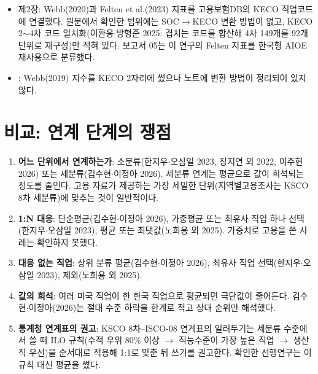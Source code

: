 \documentclass[11pt]{article}
\begin{document}
\begin{itemize}
  \item \textcite{noh-2025-ai-labor-coexistence} 제2장: Webb(2020)과 Felten et al.(2023) 지표를 고용보험DB의 KECO 직업코드에 연결했다. 원문에서 확인한 범위에는 SOC$\to$KECO 변환 방법이 없고, KECO 2$\sim$4차 코드 일치화(이환웅$\cdot$방형준 2025: 겹치는 코드를 합산해 4차 149개를 92개 단위로 재구성)만 적혀 있다. 보고서 05는 이 연구의 Felten 지표를 한국형 AIOE 재사용으로 분류했다.
  \item \textcite{kiet-2024-ai-labor-market-industry}: Webb(2019) 지수를 KECO 2자리에 썼으나 노트에 변환 방법이 정리되어 있지 않다.
\end{itemize}

\section{비교: 연계 단계의 쟁점}

\begin{enumerate}[label=\arabic*.]
  \item \textbf{어느 단위에서 연계하는가}: 소분류(한지우$\cdot$오삼일 2023, 장지연 외 2022, 이주현 2026) 또는 세분류(김수현$\cdot$이정아 2026). 세분류 연계는 평균으로 값이 희석되는 정도를 줄인다. 고용 자료가 제공하는 가장 세밀한 단위(지역별고용조사는 KSCO 8차 세분류)에 맞추는 것이 일반적이다.
  \item \textbf{1:N 대응}: 단순평균(김수현$\cdot$이정아 2026), 가중평균 또는 최유사 직업 하나 선택(한지우$\cdot$오삼일 2023), 평균 또는 최댓값(노희용 외 2025). 가중치로 고용을 쓴 사례는 확인하지 못했다.
  \item \textbf{대응 없는 직업}: 상위 분류 평균(김수현$\cdot$이정아 2026), 최유사 직업 선택(한지우$\cdot$오삼일 2023), 제외(노희용 외 2025).
  \item \textbf{값의 희석}: 여러 미국 직업이 한 한국 직업으로 평균되면 극단값이 줄어든다. 김수현$\cdot$이정아(2026)는 절대 수준 하락을 한계로 적고 상대 순위만 해석했다.
  \item \textbf{통계청 연계표의 권고}: KSCO 8차–ISCO-08 연계표의 일러두기는 세분류 수준에서 쓸 때 ILO 규칙(수적 우위 80\% 이상 $\to$ 직능수준이 가장 높은 직업 $\to$ 생산직 우선)을 순서대로 적용해 1:1로 맞춘 뒤 쓰기를 권고한다. 확인한 선행연구는 이 규칙 대신 평균을 썼다.
\end{enumerate}

\end{document}
